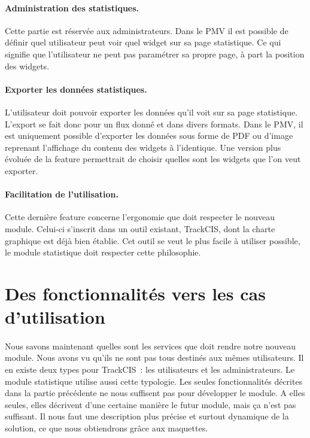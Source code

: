 			\paragraph{Administration des statistiques.}
			Cette partie est réservée aux administrateurs. Dans le
			PMV il est possible de définir quel utilisateur peut voir quel widget sur sa
			page statistique. Ce qui signifie que l'utilisateur ne peut pas paramétrer
			sa propre page, à part la position des widgets.
			
			\paragraph{Exporter les données statistiques.}
			L'utilisateur doit pouvoir exporter les données qu'il voit sur sa page
			statistique. L'export se fait donc pour un flux donné et dans divers formats.
			Dans le PMV, il est uniquement possible d'exporter les données sous forme de
			PDF ou d'image reprenant l'affichage du contenu des widgets à l'identique.
			Une version plus évoluée de la feature permettrait de choisir quelles sont
			les widgets que l'on veut exporter.
			
			\paragraph{Facilitation de l’utilisation.}
			Cette dernière feature concerne l'ergonomie que doit respecter le nouveau
			module. Celui-ci s'inscrit dans un outil existant, TrackCIS, dont
			la charte graphique est déjà bien établie. Cet outil se veut le plus facile à
			utiliser possible, le module statistique doit respecter cette philosophie.
	
	\section{Des fonctionnalités vers les cas d'utilisation}
		\paragraph{}
		Nous savons maintenant quelles sont les services que doit rendre notre nouveau
		module. Nous avons vu qu'ils ne sont pas tous destinés aux mêmes utilisateurs.
		Il en existe deux types pour TrackCIS~: les utilisateurs et les
		administrateurs. Le module statistique utilise aussi cette typologie. Les
		seules fonctionnalités décrites dans la partie précédente ne nous suffisent
		pas pour développer le module. A elles seules, elles décrivent d'une certaine
		manière le futur module, mais ça n'est pas suffisant. Il nous faut une
		description plus précise et surtout dynamique de la solution, ce que nous
		obtiendrons grâce aux maquettes.
		
